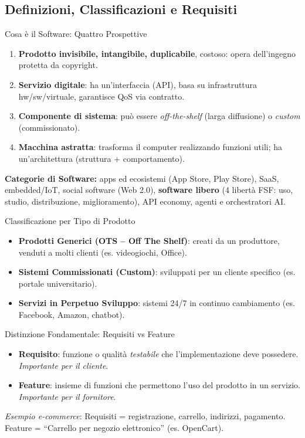\documentclass[12pt]{extarticle}
\begin{document}
\subsection{Definizioni, Classificazioni e Requisiti}
\begin{cbox}{Cosa è il Software: Quattro Prospettive}
\begin{enumerate}
    \item \textbf{Prodotto invisibile, intangibile, duplicabile}, costoso: opera dell'ingegno protetta da copyright.
    \item \textbf{Servizio digitale}: ha un'interfaccia (API), basa su infrastruttura hw/sw/virtuale, garantisce QoS via contratto.
    \item \textbf{Componente di sistema}: può essere \textit{off-the-shelf} (larga diffusione) o \textit{custom} (commissionato).
    \item \textbf{Macchina astratta}: trasforma il computer realizzando funzioni utili; ha un'architettura (struttura + comportamento).
\end{enumerate}
\end{cbox}

\noindent \textbf{Categorie di Software:} apps ed ecosistemi (App Store, Play Store), SaaS, embedded/IoT, social software (Web 2.0), \textbf{software libero} (4 libertà FSF: uso, studio, distribuzione, miglioramento), API economy, agenti e orchestratori AI.

\begin{cbox}{Classificazione per Tipo di Prodotto}
\begin{itemize}
    \item \textbf{Prodotti Generici (OTS -- Off The Shelf)}: creati da un produttore, venduti a molti clienti (es. videogiochi, Office).
    \item \textbf{Sistemi Commissionati (Custom)}: sviluppati per un cliente specifico (es. portale universitario).
    \item \textbf{Servizi in Perpetuo Sviluppo}: sistemi 24/7 in continuo cambiamento (es. Facebook, Amazon, chatbot).
\end{itemize}
\end{cbox}

\begin{cbox}{Distinzione Fondamentale: Requisiti vs Feature}
\begin{itemize}
    \item \textbf{Requisito}: funzione o qualità \textit{testabile} che l'implementazione deve possedere. \textit{Importante per il cliente}.
    \item \textbf{Feature}: insieme di funzioni che permettono l'uso del prodotto in un servizio. \textit{Importante per il fornitore}.
\end{itemize}
\noindent \textit{Esempio e-commerce}: Requisiti = registrazione, carrello, indirizzi, pagamento. Feature = ``Carrello per negozio elettronico'' (es. OpenCart).
\end{cbox}
\end{document}
